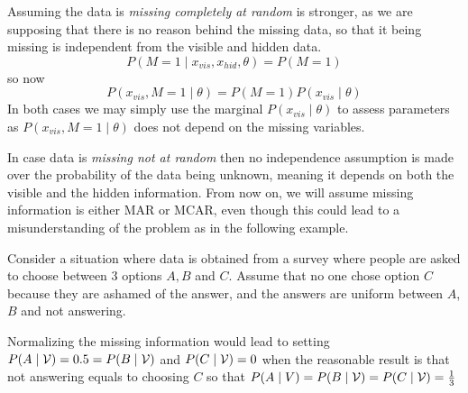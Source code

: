 Assuming the data is \emph{missing completely at random} is stronger, as we are supposing that there is no reason behind the missing data, so that it being missing is independent from the visible and hidden data.
\[
  P(M = 1 \mid x_{vis}, x_{hid}, \theta) = P(M = 1)
\]
so now
\[
    P( x_{vis}, M = 1 \mid \theta) = P(M = 1)P( x_{vis} \mid \theta)
\]
In both cases we may simply use the marginal \(P(x_{vis} \mid \theta)\) to assess parameters as \(P( x_{vis}, M = 1 \mid \theta)\) does not depend on the missing variables.

In case data is \emph{missing not at random} then no independence assumption is made over the probability of the data being unknown, meaning it depends on both the visible and the hidden information. From now on, we will assume missing information is either MAR or MCAR, even though this could lead to a misunderstanding of the problem as in the following example.

\begin{exampleth}
  Consider a situation where data is obtained from a survey where people are asked to choose between 3 options \(A, B\) and \(C\). Assume that no one chose option \(C\) because they are ashamed of the answer, and the answers are uniform between \(A\), \(B\) and not answering.

  Normalizing the missing information would lead to setting \(P(A \mid \mathcal{V}) = 0.5 = P(B \mid \mathcal{V})\) and \(P(C \mid \mathcal{V}) = 0\) when the reasonable result is that not answering equals to choosing \(C\) so that \(P(A \mid V) = P(B \mid \mathcal{V}) = P(C \mid \mathcal{V}) = \frac{1}{3}\)
\end{exampleth}
